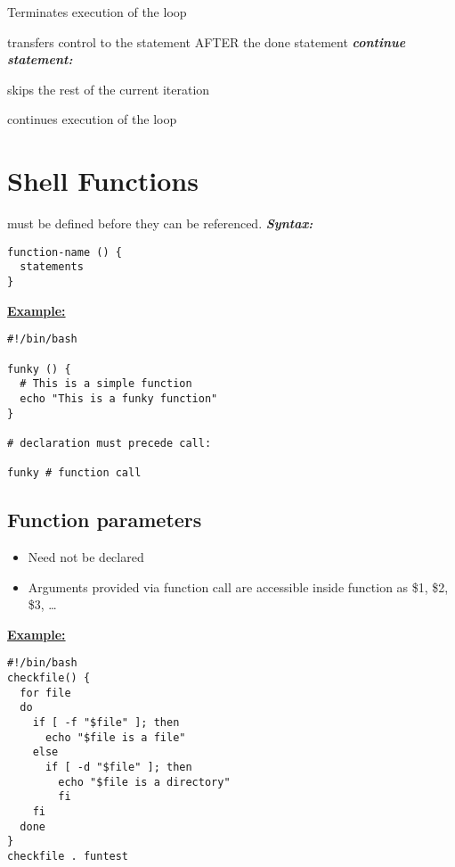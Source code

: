 \documentclass{report}
\begin{document}
\noindent Terminates execution of the loop \vspace{1.5mm}

\noindent transfers control to the statement AFTER the done statement
\bigbreak \noindent
\textit{\textbf{continue statement:}} \vspace{1.5mm}

\noindent skips the rest of the current iteration \vspace{1.5mm}

\noindent continues execution of the loop
\pagebreak
\section{Shell Functions}
must be defined before they can be referenced.
\bigbreak \noindent
\textbf{\textit{Syntax:}}
\begin{verbatim}
function-name () {
  statements
}
\end{verbatim}
\bigbreak \noindent
\textbf{\underline{Example:}}
\begin{mdframed}
\begin{verbatim}
#!/bin/bash

funky () {
  # This is a simple function
  echo "This is a funky function"
}

# declaration must precede call:

funky # function call
\end{verbatim}
\end{mdframed}
\subsection{Function parameters}
\begin{itemize}
  \item Need not be declared 
  \item Arguments provided via function call are accessible inside function as \$1, \$2, \$3, \ldots
\end{itemize}
\bigbreak \noindent
\textbf{\underline{Example:}}
\begin{mdframed}
\begin{verbatim}
#!/bin/bash
checkfile() {
  for file
  do
    if [ -f "$file" ]; then
      echo "$file is a file"
    else
      if [ -d "$file" ]; then
        echo "$file is a directory"
        fi
    fi
  done
}
checkfile . funtest
\end{verbatim}
\end{mdframed}
\end{document}

